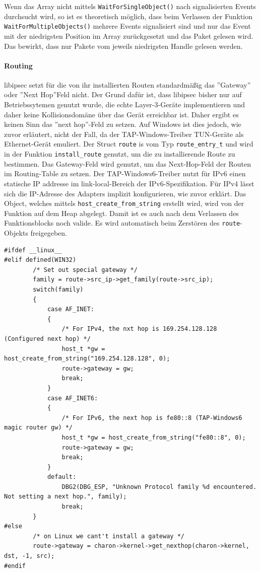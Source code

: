 {Wenn das Array nicht mittels \texttt{WaitForSingleObject()} nach signalisierten Events
durchsucht wird, so ist es theoretisch möglich, dass beim Verlassen der Funktion \texttt{WaitForMultipleObjects()}
mehrere Events signalisiert sind und nur das Event mit der niedrigsten Position im Array
zurückgesetzt und das Paket gelesen wird. Das bewirkt, dass nur Pakete vom jeweils niedrigsten Handle
gelesen werden.

\paragraph{Routing}
libipsec setzt für die von ihr installierten Routen standardmäßig das ''Gateway''
oder ''Next Hop''Feld nicht. Der Grund dafür ist, dass libipsec bisher nur auf
Betriebssytemen genutzt wurde, die echte Layer-3-Geräte implementieren und
daher keine Kollisionsdomäne über das Gerät erreichbar ist. Daher ergibt es keinen
Sinn das ''next hop''-Feld zu setzen.
Auf Windows ist dies jedoch, wie zuvor erläutert, nicht der Fall, da der TAP-Windows-Treiber
TUN-Geräte als Ethernet-Gerät emuliert.
Der Struct \texttt{route} is vom Typ \texttt{route\_entry\_t} und wird in der Funktion
\texttt{install\_route} genutzt, um die zu installierende Route zu bestimmen.
Das Gateway-Feld wird genutzt, um das Next-Hop-Feld der Routen im Routing-Table
zu setzen. 
Der TAP-Windows6-Treiber nutzt für IPv6 einen statische IP addresse im link-local-Bereich
der IPv6-Spezifikation.
Für IPv4 lässt sich die IP-Adresse des Adapters implizit konfigurieren, wie zuvor erklärt.
Das Object, welches mittels \texttt{host\_create\_from\_string} erstellt wird,
wird von der Funktion auf dem Heap abgelegt. Damit ist es auch nach dem Verlassen
des Funktionsblocks noch valide. Es wird automatisch beim Zerstören des
\texttt{route}-Objekts freigegeben.

\begin{lstlisting}[caption=Patch für die Routen-Installation von libipsec]
#ifdef __linux__
#elif defined(WIN32)
        /* Set out special gateway */
        family = route->src_ip->get_family(route->src_ip);
        switch(family)
        {
            case AF_INET:
            {
                /* For IPv4, the nxt hop is 169.254.128.128 (Configured next hop) */
                host_t *gw = host_create_from_string("169.254.128.128", 0);
                route->gateway = gw;
                break;
            }
            case AF_INET6:
            {
                /* For IPv6, the next hop is fe80::8 (TAP-Windows6 magic router gw) */
                host_t *gw = host_create_from_string("fe80::8", 0);
                route->gateway = gw;
                break;
            }
            default:
                DBG2(DBG_ESP, "Unknown Protocol family %d encountered. Not setting a next hop.", family);
                break;
        }
#else
        /* on Linux we cant't install a gateway */
        route->gateway = charon->kernel->get_nexthop(charon->kernel, dst, -1, src);
#endif
\end{lstlisting}

}
